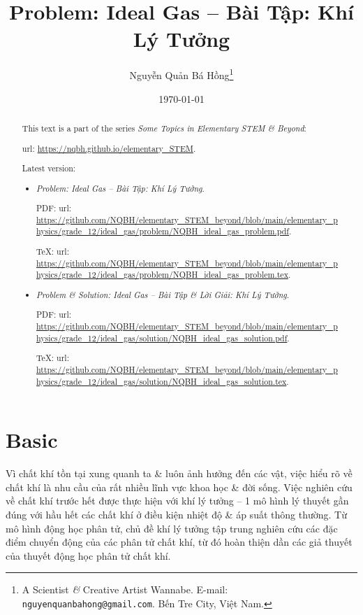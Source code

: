 \documentclass{article}
\title{Problem: Ideal Gas -- Bài Tập: Khí Lý Tưởng}
\author{Nguyễn Quản Bá Hồng\footnote{A Scientist {\it\&} Creative Artist Wannabe. E-mail: {\tt nguyenquanbahong@gmail.com}. Bến Tre City, Việt Nam.}}
\date{\today}
\begin{document}
\maketitle
\begin{abstract}
	This text is a part of the series {\it Some Topics in Elementary STEM \& Beyond}:
	
	{\sc url}: \url{https://nqbh.github.io/elementary_STEM}.
	
	Latest version:
	\begin{itemize}
		\item {\it Problem: Ideal Gas -- Bài Tập: Khí Lý Tưởng}.
		
		PDF: {\sc url}: \url{https://github.com/NQBH/elementary_STEM_beyond/blob/main/elementary_physics/grade_12/ideal_gas/problem/NQBH_ideal_gas_problem.pdf}.
		
		\TeX: {\sc url}: \url{https://github.com/NQBH/elementary_STEM_beyond/blob/main/elementary_physics/grade_12/ideal_gas/problem/NQBH_ideal_gas_problem.tex}.
		\item {\it Problem \& Solution: Ideal Gas -- Bài Tập \& Lời Giải: Khí Lý Tưởng}.
		
		PDF: {\sc url}: \url{https://github.com/NQBH/elementary_STEM_beyond/blob/main/elementary_physics/grade_12/ideal_gas/solution/NQBH_ideal_gas_solution.pdf}.
		
		\TeX: {\sc url}: \url{https://github.com/NQBH/elementary_STEM_beyond/blob/main/elementary_physics/grade_12/ideal_gas/solution/NQBH_ideal_gas_solution.tex}.
	\end{itemize}
\end{abstract}
\tableofcontents


\section{Basic}
Vì chất khí tồn tại xung quanh ta \& luôn ảnh hưởng đến các vật, việc hiểu rõ về chất khí là nhu cầu của rất nhiều lĩnh vực khoa học \& đời sống. Việc nghiên cứu về chất khí trước hết được thực hiện với khí lý tưởng -- 1 mô hình lý thuyết gần đúng với hầu hết các chất khí ở điều kiện nhiệt độ \& áp suất thông thường. Từ mô hình động học phân tử, chủ đề khí lý tưởng tập trung nghiên cứu các đặc điểm chuyển động của các phân tử chất khí, từ đó hoàn thiện dần các giả thuyết của thuyết động học phân tử chất khí.
\end{document}
